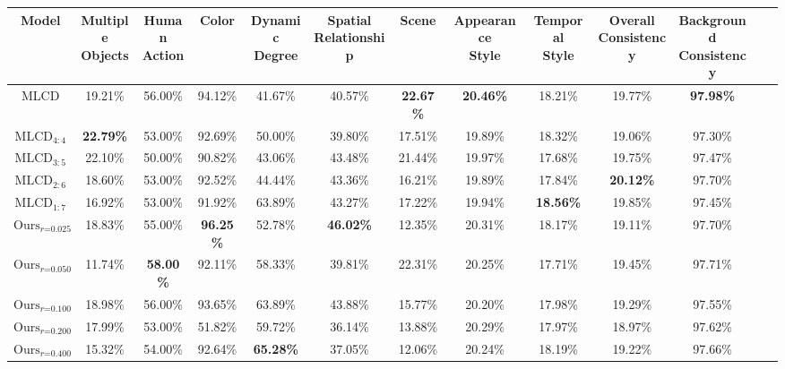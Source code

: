 \begin{table*}[h]
    \vspace{+5mm}
    
    \begin{tabular}{ccccccccccccc}
    \toprule 
    \textbf{Model} & \makecell{\textbf{Multiple} \\ \textbf{Objects}} &  \makecell{\textbf{Human} \\ \textbf{Action}} & \textbf{Color} & \makecell{\textbf{Dynamic} \\ \textbf{Degree}} & \makecell{\textbf{Spatial} \\ \textbf{Relationship}} & \textbf{Scene} & \makecell{\textbf{Appearance} \\ \textbf{Style}} & \makecell{\textbf{Temporal} \\ \textbf{Style}} & \makecell{\textbf{Overall} \\ \textbf{Consistency}} & \makecell{\textbf{Background} \\ \textbf{Consistency}} \\
    \midrule
    MLCD & 19.21\% & 56.00\% & 94.12\% & 41.67\% & 40.57\% & \textbf{22.67\%} & \textbf{20.46\%} & 18.21\% & 19.77\% & \textbf{97.98\%} \\ 
    $\text{MLCD}_{4:4}$ & \textbf{22.79\%} & 53.00\% & 92.69\% & 50.00\% & 39.80\% & 17.51\% & 19.89\% & 18.32\% & 19.06\% & 97.30\%  \\ 
    $\text{MLCD}_{3:5}$ & 22.10\% & 50.00\% & 90.82\% & 43.06\% & 43.48\% & 21.44\% & 19.97\% & 17.68\% & 19.75\% & 97.47\%  \\ 
    $\text{MLCD}_{2:6}$ & 18.60\% & 53.00\% & 92.52\% & 44.44\% & 43.36\% & 16.21\% & 19.89\% & 17.84\% & \textbf{20.12\%} & 97.70\%  \\ 
    $\text{MLCD}_{1:7}$ & 16.92\% & 53.00\% & 91.92\% & 63.89\% & 43.27\% & 17.22\% & 19.94\% & \textbf{18.56\%} & 19.85\% & 97.45\% \\ 
    \midrule 
    $\text{Ours}_{r\text{=0.025}}$ & 18.83\% & 55.00\% & \textbf{96.25\%} & 52.78\% & \textbf{46.02\%} & 12.35\% & 20.31\% & 18.17\% & 19.11\% & 97.70\% \\ 
    $\text{Ours}_{r\text{=0.050}}$ & 11.74\% &  \textbf{58.00\%} & 92.11\% & 58.33\% & 39.81\% & 22.31\% & 20.25\% & 17.71\% & 19.45\% & 97.71\% \\ 
    $\text{Ours}_{r\text{=0.100}}$ & 18.98\% & 56.00\% & 93.65\% & 63.89\% & 43.88\% & 15.77\% & 20.20\% & 17.98\% & 19.29\% & 97.55\% \\ 
    $\text{Ours}_{r\text{=0.200}}$ & 17.99\% & 53.00\% & 51.82\% & 59.72\% & 36.14\% & 13.88\% & 20.29\% & 17.97\% & 18.97\% & 97.62\%  \\ 
    $\text{Ours}_{r\text{=0.400}}$ & 15.32\% & 54.00\% & 92.64\% & \textbf{65.28\%} & 37.05\% & 12.06\% & 20.24\% & 18.19\% & 19.22\% & 97.66\%  \\ 
    \bottomrule
    \end{tabular}
\end{table*}


